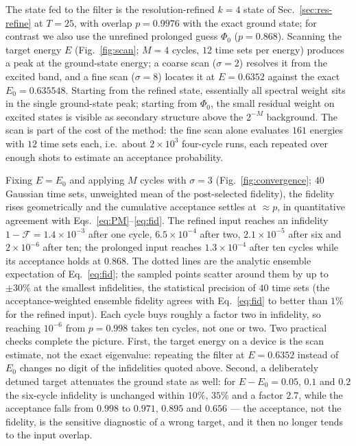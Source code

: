 \documentclass[
  aps,            %
  prc,            %
  reprint,        %
  superscriptaddress,
  floatfix,
  nofootinbib
]{revtex4-2}
\begin{document}
The state fed to the filter is the resolution-refined $k=4$ state of
Sec.~\ref{sec:res-refine} at $T=25$, with overlap $p=0.9976$ with the exact ground
state; for contrast we also use the unrefined prolonged guess $\Phi_0$ ($p=0.868$).
Scanning the target energy $E$ (Fig.~\ref{fig:scan}; $M=4$ cycles, $12$ time sets
per energy) produces a peak at the ground-state energy; a coarse scan
($\sigma=2$) resolves it from the excited band, and a fine scan ($\sigma=8$)
locates it at $E=0.6352$ against the exact $E_0=0.635548$.  Starting from the
refined state, essentially all spectral weight sits in the single ground-state
peak; starting from $\Phi_0$, the small residual weight on excited states is
visible as secondary structure above the $2^{-M}$ background.  The scan is part
of the cost of the method: the fine scan alone evaluates $161$ energies with
$12$ time sets each, i.e.\ about $2\times10^{3}$ four-cycle runs, each repeated
over enough shots to estimate an acceptance probability.

Fixing $E=E_0$ and applying $M$ cycles with $\sigma=3$
(Fig.~\ref{fig:convergence}; $40$ Gaussian time sets, unweighted mean of the
post-selected fidelity), the fidelity rises geometrically and the cumulative
acceptance settles at $\approx p$, in quantitative agreement with
Eqs.~\eqref{eq:PM}--\eqref{eq:fid}.  The refined input reaches an infidelity
$1-\mathcal{F}=1.4\times10^{-3}$ after one cycle, $6.5\times10^{-4}$ after two,
$2.1\times10^{-5}$ after six and $2\times10^{-6}$ after ten; the prolonged input
reaches $1.3\times10^{-4}$ after ten cycles while its acceptance holds at
$0.868$.  The dotted lines are the analytic ensemble expectation of
Eq.~\eqref{eq:fid}; the sampled points scatter around them by up to $\pm30\%$
at the smallest infidelities, the statistical precision of $40$ time sets
(the acceptance-weighted ensemble fidelity agrees with Eq.~\eqref{eq:fid} to
better than $1\%$ for the refined input).  Each cycle buys roughly a factor two
in infidelity, so reaching $10^{-6}$ from $p=0.998$ takes ten cycles, not one
or two.  Two practical checks complete the picture.  First, the target energy
on a device is the scan estimate, not the exact eigenvalue: repeating the
filter at $E=0.6352$ instead of $E_0$ changes no digit of the infidelities
quoted above.  Second, a deliberately detuned target attenuates the ground
state as well: for $E-E_0=0.05$, $0.1$ and $0.2$ the six-cycle infidelity is
unchanged within $10\%$, $35\%$ and a factor $2.7$, while the acceptance falls
from $0.998$ to $0.971$, $0.895$ and $0.656$ --- the acceptance, not the
fidelity, is the sensitive diagnostic of a wrong target, and it then no longer
tends to the input overlap.
\end{document}
